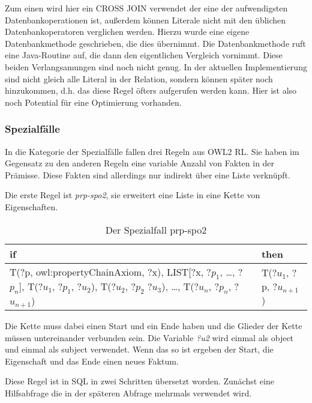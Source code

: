 Zum einen wird hier ein CROSS JOIN verwendet der eine der aufwendigsten Datenbankoperationen ist, außerdem können Literale nicht mit den üblichen Datenbankoperatoren verglichen werden. Hierzu wurde eine eigene Datenbankmethode geschrieben, die dies übernimmt. Die Datenbankmethode ruft eine Java-Routine auf, die dann den eigentlichen Vergleich vornimmt. Diese beiden Verlangsamungen sind noch nicht genug. In der aktuellen Implementierung sind nicht gleich alle Literal in der Relation, sondern können später noch hinzukommen, d.h. das diese Regel öfters aufgerufen werden kann. Hier ist also noch Potential für eine Optimierung vorhanden.


\subsubsection{Spezialfälle} 
In die Kategorie der Spezialfälle fallen drei Regeln aus OWL2 RL. Sie haben im Gegensatz zu den anderen Regeln eine variable Anzahl von Fakten in der Prämisse. Diese Fakten sind allerdings nur indirekt über eine Liste verknüpft.

Die erste Regel ist \emph{prp-spo2}, sie erweitert eine Liste in eine Kette von Eigenschaften.
\begin{table}[htb]
\begin{center}
	\begin{tabular}{m{7cm}|m{3cm}}
	if & then \\ \hline
	T(?p, owl:propertyChainAxiom, ?x),\newline
	LIST[?x, ?$p_1$, \ldots, ?$p_n$],\newline
	T(?$u_1$, ?$p_1$, ?$u_2$),\newline
	T(?$u_2$, ?$p_2$ ?$u_3$),\newline
	\ldots,\newline
	T(?$u_n$, ?$p_n$, ?$u_{n+1}$) & T(?$u_1$, ?p, ?$u_{n+1}$)
	\end{tabular}
\end{center}
	\caption{Der Spezialfall prp-spo2}
	\label{rule-prp-spo2}
\end{table}

Die Kette muss dabei einen Start und ein Ende haben und die Glieder der Kette müssen untereinander verbunden sein. Die Variable \emph{?u2} wird einmal als object und einmal als subject verwendet. Wenn das so ist ergeben der Start, die Eigenschaft und das Ende einen neues Faktum.

Diese Regel ist in SQL in zwei Schritten übersetzt worden. Zunächst eine Hilfsabfrage die in der späteren Abfrage mehrmals verwendet wird.


